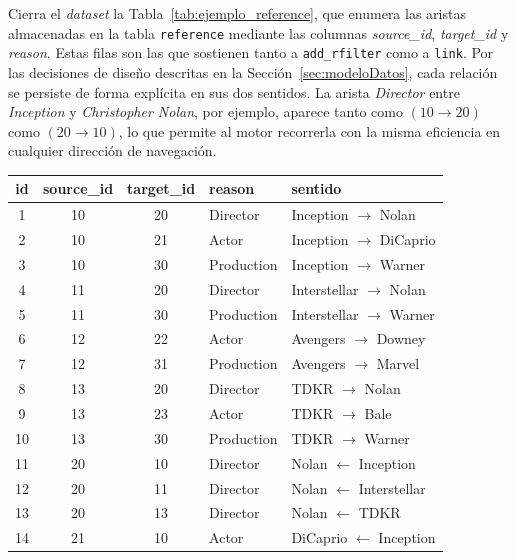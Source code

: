 \FloatBarrier

Cierra el \textit{dataset} la Tabla~\ref{tab:ejemplo_reference}, que enumera las
aristas almacenadas en la tabla \texttt{reference} mediante las columnas
\textit{source\_id}, \textit{target\_id} y \textit{reason}. Estas filas
son las que sostienen tanto a \texttt{add\_rfilter} como a \texttt{link}.
Por las decisiones de diseño descritas en la
Sección~\ref{sec:modeloDatos}, cada relación se persiste de forma
explícita en sus dos sentidos. La arista \textit{Director} entre
\textit{Inception} y \textit{Christopher Nolan}, por ejemplo, aparece
tanto como $(10 \to 20)$ como $(20 \to 10)$, lo que permite al motor
recorrerla con la misma eficiencia en cualquier dirección de
navegación.

\begin{table}[h]
  \centering
  \footnotesize
  \begin{tabular}{|c|c|c|l|l|}
    \hline
    \textbf{id} & \textbf{source\_id} & \textbf{target\_id} & \textbf{reason} & \textbf{sentido} \\ \hline
    1  & 10 & 20 & Director   & Inception $\to$ Nolan    \\ \hline
    2  & 10 & 21 & Actor      & Inception $\to$ DiCaprio \\ \hline
    3  & 10 & 30 & Production & Inception $\to$ Warner   \\ \hline
    4  & 11 & 20 & Director   & Interstellar $\to$ Nolan  \\ \hline
    5  & 11 & 30 & Production & Interstellar $\to$ Warner \\ \hline
    6  & 12 & 22 & Actor      & Avengers $\to$ Downey     \\ \hline
    7  & 12 & 31 & Production & Avengers $\to$ Marvel     \\ \hline
    8  & 13 & 20 & Director   & TDKR $\to$ Nolan     \\ \hline
    9  & 13 & 23 & Actor      & TDKR $\to$ Bale      \\ \hline
    10 & 13 & 30 & Production & TDKR $\to$ Warner    \\ \hline
    11 & 20 & 10 & Director   & Nolan $\leftarrow$ Inception      \\ \hline
    12 & 20 & 11 & Director   & Nolan $\leftarrow$ Interstellar   \\ \hline
    13 & 20 & 13 & Director   & Nolan $\leftarrow$ TDKR           \\ \hline
    14 & 21 & 10 & Actor      & DiCaprio $\leftarrow$ Inception   \\ \hline

\end{tabular}
\end{table}
